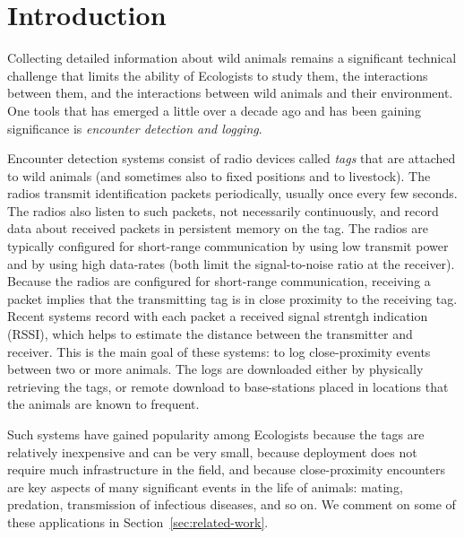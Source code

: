 \section{Introduction}

Collecting detailed information about wild animals remains a significant technical challenge that
limits the ability of Ecologists to study them, the interactions between them, and the interactions 
between wild animals and their environment. One tools that has emerged a little over a decade ago
and has been gaining significance is {\em encounter detection and logging}.

Encounter detection systems consist of radio devices called {\em tags} that are attached to wild
animals (and sometimes also to fixed positions and to livestock). The radios transmit identification
packets periodically, usually once every few seconds. The radios also listen to such packets, not
necessarily continuously, and record data about received packets in persistent memory on the tag. The
radios are typically configured for short-range communication by using low transmit power and by 
using high data-rates (both limit the signal-to-noise ratio at the receiver). Because the radios
are configured for short-range communication, receiving a packet implies that the transmitting tag is
in close proximity to the receiving tag. Recent systems record with each packet a received signal strentgh
indication (RSSI), which helps to estimate the distance between the transmitter and receiver.
This is the main goal of these systems: to log close-proximity
events between two or more animals. The logs are downloaded either by physically retrieving the tags,
or remote download to base-stations placed in locations that the animals are known to frequent.

Such systems have gained popularity among Ecologists because the tags are relatively inexpensive and can
be very small, because deployment does not require much infrastructure in the field, and because close-proximity
encounters are key aspects of many significant events in the life of animals: mating, predation, transmission of infectious
diseases, and so on. We comment on some of these applications in Section~\ref{sec:related-work}.

